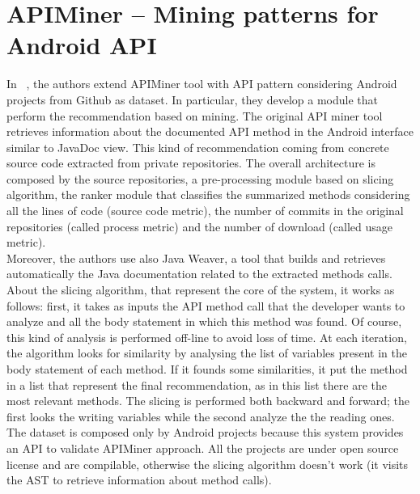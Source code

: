 \section{APIMiner -- Mining patterns for Android  API}
In  ~\cite{borges_mining_2015}, the authors extend APIMiner tool with API pattern considering Android projects from Github as dataset. In particular, they develop a module that perform the recommendation based on mining. The original API miner tool~\cite{montandon_documenting_2013}  retrieves information about the documented API method in the Android interface similar to JavaDoc view. This kind of recommendation coming from  concrete source code extracted from private repositories. The overall  architecture is composed by the source repositories, a pre-processing module based on slicing algorithm, the ranker module that classifies the summarized methods  considering all the lines of  code (source code metric), the number of commits in the original repositories (called process metric) and the number of download (called usage metric). \\
Moreover, the authors use also Java Weaver, a tool that builds and retrieves automatically the Java documentation related to the extracted methods calls. About the slicing algorithm, that represent the core of the system, it works as follows: first, it takes as inputs the API method call that the developer wants to analyze and all the body statement in which this method was found. Of course, this kind of analysis is performed off-line to avoid loss of time. At each iteration, the algorithm looks for similarity by analysing the list of variables present in the body statement of each method. If it founds some similarities, it put the method in a list that represent the final recommendation, as in this list there are the most relevant methods. The slicing is performed both backward and forward; the first looks the writing variables while the second analyze the the reading ones. The dataset is composed only by Android projects because this system provides an API to validate APIMiner approach. All the projects are under open source license and are compilable, otherwise the slicing algorithm doesn't work (it visits the AST to retrieve information about method calls). \\
